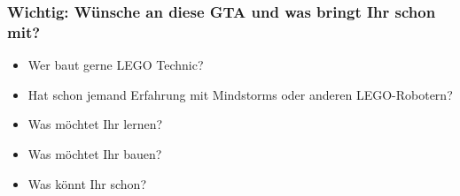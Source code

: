 \documentclass{beamer}
\begin{document}

\begin{frame}
\frametitle{Wichtig: Wünsche an diese GTA und was bringt Ihr schon mit?}
\begin{itemize}
\item Wer baut gerne LEGO Technic?
\item Hat schon jemand Erfahrung mit Mindstorms oder anderen LEGO-Robotern?
\item  Was möchtet Ihr lernen?
\item  Was möchtet Ihr bauen?
\item   Was könnt Ihr schon?
\end{itemize}
\end{frame}
\end{document}
